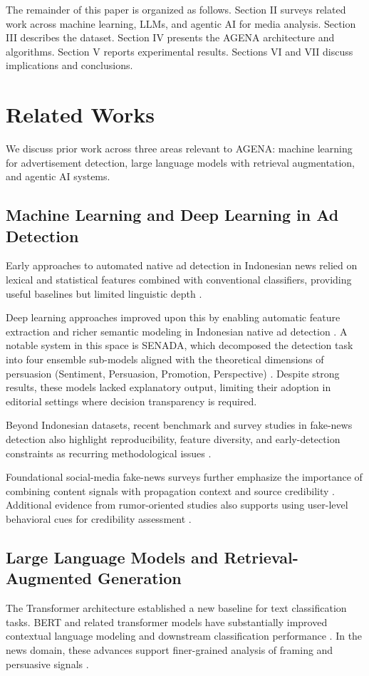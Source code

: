 \documentclass{ieeeaccess}
\begin{document}
The remainder of this paper is organized as follows. Section II surveys related work across machine learning, LLMs, and agentic AI for media analysis. Section III describes the dataset. Section IV presents the AGENA architecture and algorithms. Section V reports experimental results. Sections VI and VII discuss implications and conclusions.

\section{Related Works}
\label{sec:related-works}
We discuss prior work across three areas relevant to AGENA: machine learning for advertisement detection, large language models with retrieval augmentation, and agentic AI systems.

\subsection{Machine Learning and Deep Learning in Ad Detection}
Early approaches to automated native ad detection in Indonesian news relied on lexical and statistical features combined with conventional classifiers, providing useful baselines but limited linguistic depth \cite{b18, b21}.

Deep learning approaches improved upon this by enabling automatic feature extraction and richer semantic modeling in Indonesian native ad detection \cite{b18, b19}. A notable system in this space is SENADA, which decomposed the detection task into four ensemble sub-models aligned with the theoretical dimensions of persuasion (Sentiment, Persuasion, Promotion, Perspective) \cite{b19}. Despite strong results, these models lacked explanatory output, limiting their adoption in editorial settings where decision transparency is required.

Beyond Indonesian datasets, recent benchmark and survey studies in fake-news detection also highlight reproducibility, feature diversity, and early-detection constraints as recurring methodological issues \cite{b52, b55}.

Foundational social-media fake-news surveys further emphasize the importance of combining content signals with propagation context and source credibility \cite{b60, b62}. Additional evidence from rumor-oriented studies also supports using user-level behavioral cues for credibility assessment \cite{b61, b66}.

\subsection{Large Language Models and Retrieval-Augmented Generation}
The Transformer architecture \cite{b23} established a new baseline for text classification tasks. BERT and related transformer models have substantially improved contextual language modeling and downstream classification performance \cite{b39}. In the news domain, these advances support finer-grained analysis of framing and persuasive signals \cite{b8, b9}.
\end{document}
